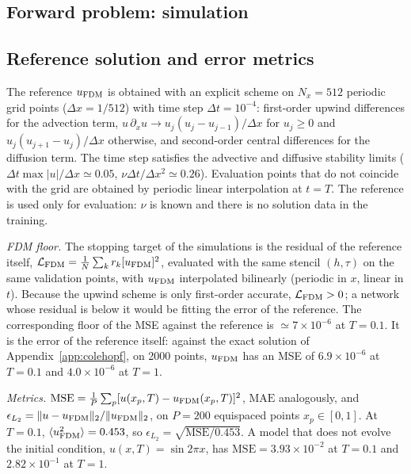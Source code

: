 \documentclass[floatfix,aps,pra,twocolumn,superscriptaddress,10pt,nofootinbib]{revtex4-2}
\begin{document}
\begin{appendices}

\section{Forward problem: simulation}\label{app:fsim}
\renewcommand{\thesubsection}{\thesection.\arabic{subsection}}
\makeatletter\renewcommand{\p@subsection}{}\makeatother

\subsection{Reference solution and error metrics}\label{app:reference}
The reference $u_{\rm FDM}$ is obtained with an explicit scheme on $N_x=512$ periodic grid points ($\Delta x=1/512$) with time step $\Delta t=10^{-4}$: first-order upwind differences for the advection term, $u\,\partial_xu\to u_j(u_j-u_{j-1})/\Delta x$ for $u_j\ge0$ and $u_j(u_{j+1}-u_j)/\Delta x$ otherwise, and second-order central differences for the diffusion term. The time step satisfies the advective and diffusive stability limits ($\Delta t\max|u|/\Delta x\simeq0.05$, $\nu\Delta t/\Delta x^2\simeq0.26$). Evaluation points that do not coincide with the grid are obtained by periodic linear interpolation at $t=T$. The reference is used only for evaluation: $\nu$ is known and there is no solution data in the training.

\emph{FDM floor.} The stopping target of the simulations is the residual of the reference itself, $\mathcal L_{\rm FDM}=\frac{1}{N}\sum_k r_k[u_{\rm FDM}]^2$, evaluated with the same stencil $(h,\tau)$ on the same validation points, with $u_{\rm FDM}$ interpolated bilinearly (periodic in $x$, linear in $t$). Because the upwind scheme is only first-order accurate, $\mathcal L_{\rm FDM}>0$; a network whose residual is below it would be fitting the error of the reference. The corresponding floor of the MSE against the reference is $\simeq7\times10^{-6}$ at $T=0.1$. It is the error of the reference itself: against the exact solution of Appendix~\ref{app:colehopf}, on 2000 points, $u_{\rm FDM}$ has an MSE of $6.9\times10^{-6}$ at $T=0.1$ and $4.0\times10^{-6}$ at $T=1$.

\emph{Metrics.} $\mathrm{MSE}=\frac1P\sum_p[u(x_p,T)-u_{\rm FDM}(x_p,T)]^2$, $\mathrm{MAE}$ analogously, and $\epsilon_{L_2}=\|u-u_{\rm FDM}\|_2/\|u_{\rm FDM}\|_2$, on $P=200$ equispaced points $x_p\in[0,1]$. At $T=0.1$, $\langle u_{\rm FDM}^2\rangle=0.453$, so $\epsilon_{L_2}=\sqrt{\mathrm{MSE}/0.453}$. A model that does not evolve the initial condition, $u(x,T)=\sin2\pi x$, has $\mathrm{MSE}=3.93\times10^{-2}$ at $T=0.1$ and $2.82\times10^{-1}$ at $T=1$.


\end{appendices}
\end{document}
